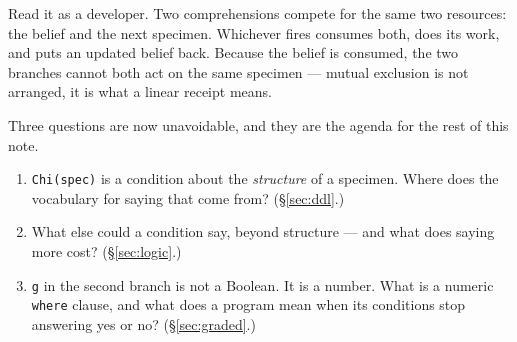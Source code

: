 Read it as a developer. Two comprehensions compete for the same two resources:
the belief and the next specimen. Whichever fires consumes both, does its work,
and puts an updated belief back. Because the belief is consumed, the two
branches cannot both act on the same specimen --- mutual exclusion is not
arranged, it is what a linear receipt means.

Three questions are now unavoidable, and they are the agenda for the rest of
this note.

\begin{enumerate}[leftmargin=2.2em]
\item \texttt{Chi(spec)} is a condition about the \emph{structure} of a
  specimen. Where does the vocabulary for saying that come from?
  (\S\ref{sec:ddl}.)
\item What else could a condition say, beyond structure --- and what does saying
  more cost? (\S\ref{sec:logic}.)
\item \texttt{g} in the second branch is not a Boolean. It is a number. What is
  a numeric \texttt{where} clause, and what does a program mean when its
  conditions stop answering yes or no? (\S\ref{sec:graded}.)
\end{enumerate}
